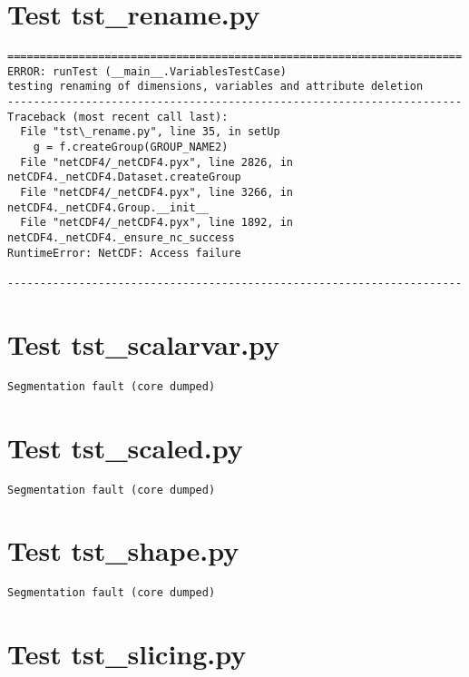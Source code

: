 \section{Test tst\_rename.py}

\begin{verbatim}
======================================================================
ERROR: runTest (__main__.VariablesTestCase)
testing renaming of dimensions, variables and attribute deletion
----------------------------------------------------------------------
Traceback (most recent call last):
  File "tst\_rename.py", line 35, in setUp
    g = f.createGroup(GROUP_NAME2)
  File "netCDF4/_netCDF4.pyx", line 2826, in netCDF4._netCDF4.Dataset.createGroup
  File "netCDF4/_netCDF4.pyx", line 3266, in netCDF4._netCDF4.Group.__init__
  File "netCDF4/_netCDF4.pyx", line 1892, in netCDF4._netCDF4._ensure_nc_success
RuntimeError: NetCDF: Access failure

----------------------------------------------------------------------
\end{verbatim}

\section{Test tst\_scalarvar.py}

\begin{verbatim}
Segmentation fault (core dumped)
\end{verbatim}

\section{Test tst\_scaled.py}

\begin{verbatim}
Segmentation fault (core dumped)
\end{verbatim}

\section{Test tst\_shape.py}

\begin{verbatim}
Segmentation fault (core dumped)
\end{verbatim}

\section{Test tst\_slicing.py}

